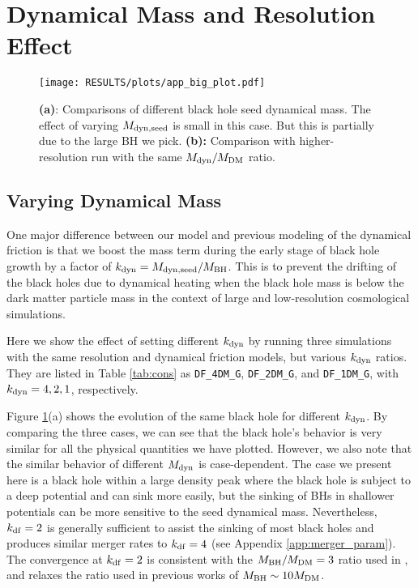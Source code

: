 
\section{Dynamical Mass and Resolution Effect}
\label{app:res}
\begin{figure*}
\texttt{[image: RESULTS/plots/app\_big\_plot.pdf]}

\caption{\textbf{(a)}: Comparisons of different black hole seed dynamical mass. The effect of varying $M_{\rm dyn,seed}$ is small in this case. But this is partially due to the large BH we pick. \textbf{(b):} Comparison with higher-resolution run with the same $M_{\rm dyn}/M_{\rm DM}$ ratio.}
\label{fig:app_res}
\end{figure*}

\subsection{Varying Dynamical Mass}

One major difference between our model and previous modeling of the dynamical friction is that we boost the mass term during the early stage of black hole growth by a factor of $k_{\rm dyn} = M_{\rm dyn,seed}/M_{\rm BH}$. This is to prevent the drifting of the black holes due to dynamical heating when the black hole mass is below the dark matter particle mass in the context of large and low-resolution cosmological simulations.

Here we show the effect of setting different $k_{\rm dyn}$ by running three simulations with the same resolution and dynamical friction models, but various $k_{\rm dyn}$ ratios. They are listed in Table \ref{tab:cons} as \texttt{DF\_4DM\_G}, \texttt{DF\_2DM\_G}, and \texttt{DF\_1DM\_G}, with $k_{\rm dyn}=4,2,1$, respectively.

Figure \ref{fig:app_res}(a) shows the evolution of the same black hole for different $k_{\rm dyn}$. By comparing the three cases, we can see that the black hole's behavior is very similar for all the physical quantities we have plotted. However, we also note that the similar behavior of different $M_{\rm dyn}$ is case-dependent. The case we present here is a black hole within a large density peak where the black hole is subject to a deep potential and can sink more easily, but the sinking of BHs in shallower potentials can be more sensitive to the seed dynamical mass. Nevertheless, $k_{\rm df}=2$ is generally sufficient to assist the sinking of most black holes and produces similar merger rates to $k_{\rm df}=4$ (see Appendix \ref{app:merger_param}). The convergence at $k_{\rm df}=2$ is consistent with the $M_{\rm BH}/M_{\rm DM}=3$ ratio used in \cite{Tremmel2018}, and relaxes the ratio used in previous works \citep[e.g.][]{Tremmel2015,Pfister2019} of $M_{\rm BH}\sim 10M_{\rm DM}$.

